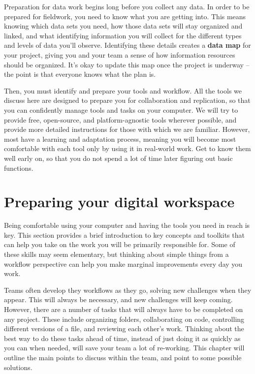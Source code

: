 
\begin{fullwidth}
Preparation for data work begins long before you collect any data.
In order to be prepared for fieldwork, you need to know what you are getting into.
This means knowing which data sets you need,
how those data sets will stay organized and linked,
and what identifying information you will collect
for the different types and levels of data you'll observe.
Identifying these details creates a \textbf{data map} for your project,
giving you and your team a sense of how information resources should be organized.
It's okay to update this map once the project is underway --
the point is that everyone knows what the plan is.

Then, you must identify and prepare your tools and workflow.
All the tools we discuss here are designed to prepare you for collaboration and replication,
so that you can confidently manage tools and tasks on your computer.
We will try to provide free, open-source, and platform-agnostic tools wherever possible,
and provide more detailed instructions for those with which we are familiar.
However, most have a learning and adaptation process,
meaning you will become most comfortable with each tool
only by using it in real-world work.
Get to know them well early on,
so that you do not spend a lot of time later figuring out basic functions.
\end{fullwidth}



\section{Preparing your digital workspace}

Being comfortable using your computer and having the tools you need in reach is key.
This section provides a brief introduction to key concepts and toolkits
that can help you take on the work you will be primarily responsible for.
Some of these skills may seem elementary,
but thinking about simple things from a workflow perspective
can help you make marginal improvements every day you work.

Teams often develop they workflows as they go,
solving new challenges when they appear.
This will always be necessary,
and new challenges will keep coming.
However, there are a number of tasks that will always have to be completed on any project.
These include organizing folders,
collaborating on code,
controlling different versions of a file,
and reviewing each other's work.
Thinking about the best way to do these tasks ahead of time,
instead of just doing it as quickly as you can when needed,
will save your team a lot of re-working.
This chapter will outline the main points to discuss within the team,
and point to some possible solutions. 

